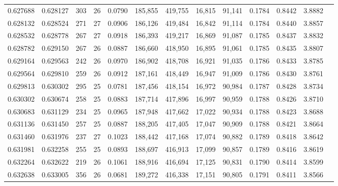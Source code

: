 \begin{tabular}{rrrrrrrrrrrrr}
0.627688 & 0.628127 &   303 &  26 &                                     0.0790 & 185,855 & 419,755 &  16,815 &  91,141 & 0.1784 & 0.8442 & 3.8882 \\
0.628132 & 0.628524 &   271 &  27 &                                     0.0906 & 186,126 & 419,484 &  16,842 &  91,114 & 0.1784 & 0.8440 & 3.8857 \\
0.628532 & 0.628778 &   267 &  27 &                                     0.0918 & 186,393 & 419,217 &  16,869 &  91,087 & 0.1785 & 0.8437 & 3.8832 \\
0.628782 & 0.629150 &   267 &  26 &                                     0.0887 & 186,660 & 418,950 &  16,895 &  91,061 & 0.1785 & 0.8435 & 3.8807 \\
0.629164 & 0.629563 &   242 &  26 &                                     0.0970 & 186,902 & 418,708 &  16,921 &  91,035 & 0.1786 & 0.8433 & 3.8785 \\
0.629564 & 0.629810 &   259 &  26 &                                     0.0912 & 187,161 & 418,449 &  16,947 &  91,009 & 0.1786 & 0.8430 & 3.8761 \\
0.629813 & 0.630302 &   295 &  25 &                                     0.0781 & 187,456 & 418,154 &  16,972 &  90,984 & 0.1787 & 0.8428 & 3.8734 \\
0.630302 & 0.630674 &   258 &  25 &                                     0.0883 & 187,714 & 417,896 &  16,997 &  90,959 & 0.1788 & 0.8426 & 3.8710 \\
0.630683 & 0.631129 &   234 &  25 &                                     0.0965 & 187,948 & 417,662 &  17,022 &  90,934 & 0.1788 & 0.8423 & 3.8688 \\
0.631136 & 0.631450 &   257 &  25 &                                     0.0887 & 188,205 & 417,405 &  17,047 &  90,909 & 0.1788 & 0.8421 & 3.8664 \\
0.631460 & 0.631976 &   237 &  27 &                                     0.1023 & 188,442 & 417,168 &  17,074 &  90,882 & 0.1789 & 0.8418 & 3.8642 \\
0.631981 & 0.632258 &   255 &  25 &                                     0.0893 & 188,697 & 416,913 &  17,099 &  90,857 & 0.1789 & 0.8416 & 3.8619 \\
0.632264 & 0.632622 &   219 &  26 &                                     0.1061 & 188,916 & 416,694 &  17,125 &  90,831 & 0.1790 & 0.8414 & 3.8599 \\
0.632638 & 0.633005 &   356 &  26 &                                     0.0681 & 189,272 & 416,338 &  17,151 &  90,805 & 0.1791 & 0.8411 & 3.8566 \\

\end{tabular}
